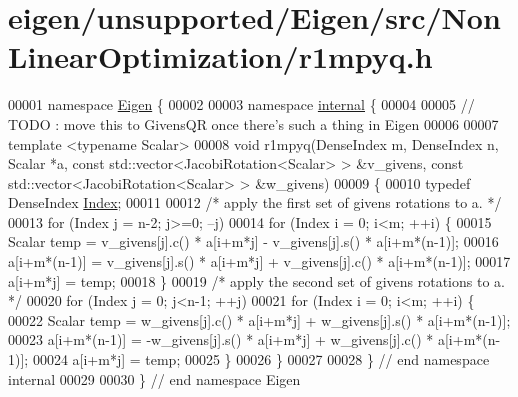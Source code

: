 \hypertarget{eigen_2unsupported_2_eigen_2src_2_non_linear_optimization_2r1mpyq_8h_source}{}\section{eigen/unsupported/\+Eigen/src/\+Non\+Linear\+Optimization/r1mpyq.h}
\label{eigen_2unsupported_2_eigen_2src_2_non_linear_optimization_2r1mpyq_8h_source}

\begin{DoxyCode}
00001 \textcolor{keyword}{namespace }\hyperlink{namespace_eigen}{Eigen} \{ 
00002 
00003 \textcolor{keyword}{namespace }\hyperlink{namespaceinternal}{internal} \{
00004 
00005 \textcolor{comment}{// TODO : move this to GivensQR once there's such a thing in Eigen}
00006 
00007 \textcolor{keyword}{template} <\textcolor{keyword}{typename} Scalar>
00008 \textcolor{keywordtype}{void} r1mpyq(DenseIndex m, DenseIndex n, Scalar *a, \textcolor{keyword}{const} std::vector<JacobiRotation<Scalar> > &v\_givens, \textcolor{keyword}{
      const} std::vector<JacobiRotation<Scalar> > &w\_givens)
00009 \{
00010     \textcolor{keyword}{typedef} DenseIndex \hyperlink{namespace_eigen_a62e77e0933482dafde8fe197d9a2cfde}{Index};
00011 
00012     \textcolor{comment}{/*     apply the first set of givens rotations to a. */}
00013     \textcolor{keywordflow}{for} (Index j = n-2; j>=0; --j)
00014         \textcolor{keywordflow}{for} (Index i = 0; i<m; ++i) \{
00015             Scalar temp = v\_givens[j].c() * a[i+m*j] - v\_givens[j].s() * a[i+m*(n-1)];
00016             a[i+m*(n-1)] = v\_givens[j].s() * a[i+m*j] + v\_givens[j].c() * a[i+m*(n-1)];
00017             a[i+m*j] = temp;
00018         \}
00019     \textcolor{comment}{/*     apply the second set of givens rotations to a. */}
00020     \textcolor{keywordflow}{for} (Index j = 0; j<n-1; ++j)
00021         \textcolor{keywordflow}{for} (Index i = 0; i<m; ++i) \{
00022             Scalar temp = w\_givens[j].c() * a[i+m*j] + w\_givens[j].s() * a[i+m*(n-1)];
00023             a[i+m*(n-1)] = -w\_givens[j].s() * a[i+m*j] + w\_givens[j].c() * a[i+m*(n-1)];
00024             a[i+m*j] = temp;
00025         \}
00026 \}
00027 
00028 \} \textcolor{comment}{// end namespace internal}
00029 
00030 \} \textcolor{comment}{// end namespace Eigen}
\end{DoxyCode}
